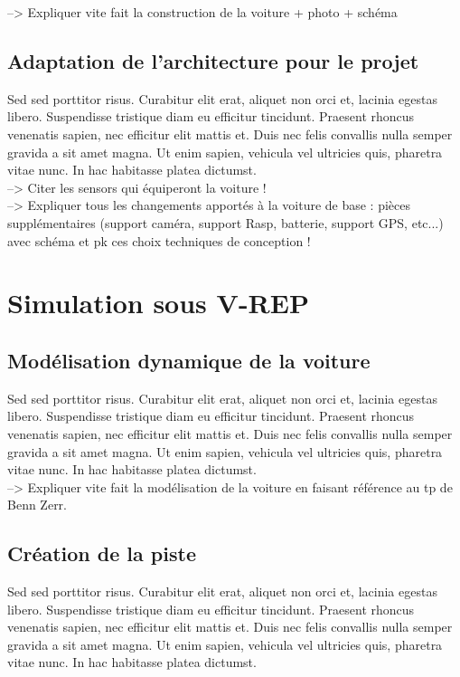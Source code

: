 \documentclass[12pt, openany]{report}
\begin{document}
--> Expliquer vite fait la construction de la voiture + photo + schéma

\subsection{Adaptation de l'architecture pour le projet}
Sed sed porttitor risus. Curabitur elit erat, aliquet non orci et, lacinia egestas libero. Suspendisse tristique diam eu efficitur tincidunt. Praesent rhoncus venenatis sapien, nec efficitur elit mattis et. Duis nec felis convallis nulla semper gravida a sit amet magna. Ut enim sapien, vehicula vel ultricies quis, pharetra vitae nunc. In hac habitasse platea dictumst.\\

--> Citer les sensors qui équiperont la voiture !\\

--> Expliquer tous les changements apportés à la voiture de base : pièces supplémentaires (support caméra, support Rasp, batterie, support GPS, etc...) avec schéma et pk ces choix techniques de conception !

\section{Simulation sous \textsc{V-REP}}
\subsection{Modélisation dynamique de la voiture}
Sed sed porttitor risus. Curabitur elit erat, aliquet non orci et, lacinia egestas libero. Suspendisse tristique diam eu efficitur tincidunt. Praesent rhoncus venenatis sapien, nec efficitur elit mattis et. Duis nec felis convallis nulla semper gravida a sit amet magna. Ut enim sapien, vehicula vel ultricies quis, pharetra vitae nunc. In hac habitasse platea dictumst.\\

--> Expliquer vite fait la modélisation de la voiture en faisant référence au tp de Benn Zerr.

\subsection{Création de la piste}
Sed sed porttitor risus. Curabitur elit erat, aliquet non orci et, lacinia egestas libero. Suspendisse tristique diam eu efficitur tincidunt. Praesent rhoncus venenatis sapien, nec efficitur elit mattis et. Duis nec felis convallis nulla semper gravida a sit amet magna. Ut enim sapien, vehicula vel ultricies quis, pharetra vitae nunc. In hac habitasse platea dictumst.\\
\end{document}
